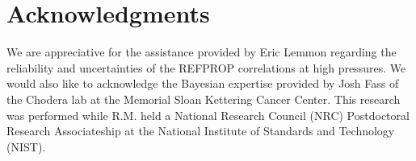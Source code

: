 \documentclass[preprint,letterpaper,floatfix,citeautoscript,aip,jcp]{revtex4-1}
\begin{document}
\section*{Acknowledgments}

We are appreciative for the assistance provided by Eric Lemmon regarding the reliability and uncertainties of the REFPROP correlations at high pressures. We would also like to acknowledge the Bayesian expertise provided by Josh Fass of the Chodera lab at the Memorial Sloan Kettering Cancer Center. This research was performed while R.M. held a National Research Council (NRC) Postdoctoral Research Associateship at the National Institute of Standards and Technology (NIST).



\end{document}
